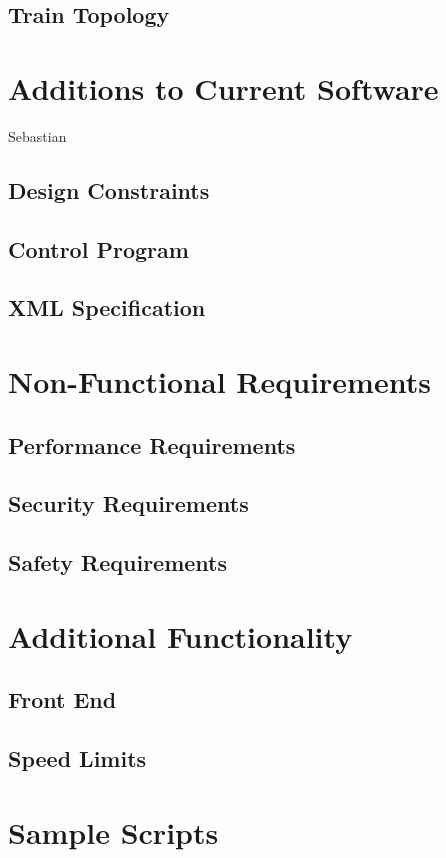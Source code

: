 \documentclass[a4paper,11pt,notitlepage]{article}
\begin{document}
\subsection{Train Topology}

\section{Additions to Current Software}
Sebastian
\subsection{Design Constraints}
\subsection{Control Program}
\subsection{XML Specification}

\section{Non-Functional Requirements}
\subsection{Performance Requirements}
\subsection{Security Requirements}
\subsection{Safety Requirements}

\section{Additional Functionality}
\subsection{Front End}
\subsection{Speed Limits}

\section{Sample Scripts}
\end{document}
